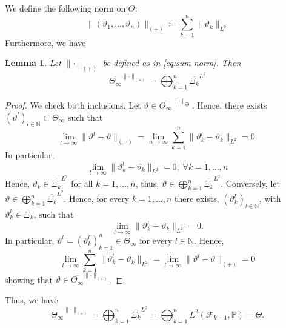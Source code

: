\documentclass[11pt,a4paper,twoside,openany]{report}
\theoremstyle{plain} %
\newtheorem{lemma}[lemma]{Lemma}
\theoremstyle{definition} %
\theoremstyle{remark} %
\begin{document}
    
We define the following norm on \(\Theta\):
\begin{equation}\label{eq:sum norm}
    \lVert(\vartheta_1,\dots,\vartheta_{n})\rVert_{(+)}\coloneqq\sum_{k=1}^{n}\lVert \vartheta_k\rVert_{L^2}
\end{equation}
Furthermore, we have 
\begin{lemma}
    Let \(\lVert\cdot\rVert_{(+)}\) be defined as in \cref{eq:sum norm}. Then 
    \begin{equation}
        \overline{\Theta_{\infty}}^{\lVert\cdot\rVert_{(+)}}=\bigoplus_{k=1}^{n}\overline{\Xi_k}^{L^2}
    \end{equation}
\end{lemma}
\begin{proof}
    We check both inclusions. Let \(\vartheta\in\overline{\Theta_{\infty}}^{\lVert\cdot\rVert_{\bigoplus}}\). Hence, there exists \((\vartheta^l)_{l\in\mathbb{N}}\subset\Theta_{\infty}\) such that 
    \begin{equation}
        \lim_{l\to\infty}\lVert \vartheta^l-\vartheta\rVert_{(+)}=\lim_{n\to\infty}\sum_{k=1}^n\lVert\vartheta^l_k-\vartheta_k\rVert_{L^2}=0.
    \end{equation}
    In particular, 
    \begin{equation}
        \lim_{l\to\infty}\lVert\vartheta^l_k-\vartheta_k\rVert_{L^2}=0,\;\forall k=1,\dots,n
    \end{equation}
    Hence, \(\vartheta_k\in\overline{\Xi_k}^{L^2}\) for all \(k=1,\dots,n\), thus, \(\vartheta\in\bigoplus_{k=1}^{n}\overline{\Xi_k}^{L^2}\). Conversely, let \(\vartheta\in\bigoplus_{k=1}^{n}\overline{\Xi_k}^{L^2}\). Hence, for every \(k=1,\dots,n\) there exists, \((\vartheta^l_k)_{l\in\mathbb{N}}\), with \(\vartheta^l_k\in\Xi_k\), such that 
    \begin{equation}
    \lim_{l\to\infty}\lVert \vartheta^l_k-\vartheta_k\rVert_{L^2}=0.
    \end{equation}
    In particular, \(\vartheta^l=(\vartheta^l_k)_{k=1}^n\in\Theta_{\infty}\) for every \(l\in\mathbb{N}\).
 Hence,
    \begin{equation}
        \lim_{l\to\infty}\sum_{k=1}^n\lVert\vartheta^l_k-\vartheta_k\rVert_{L^2}=\lim_{l\to\infty}\lVert\vartheta^l-\vartheta\rVert_{(+)}=0
    \end{equation}
    showing that \(\vartheta\in\overline{\Theta_{\infty}}^{\lVert\cdot\rVert_{(+)}}\).
\end{proof}
Thus, we have
\begin{equation}
    \overline{\Theta_{\infty}}^{\lVert\cdot\rVert_{(+)}}=\bigoplus_{k=1}^{n}\overline{\Xi_k}^{L^2}=\bigoplus_{k=1}^{n}L^2(\mathcal{F}_{k-1},\mathbb{P})=\Theta.
\end{equation}
\end{document}
